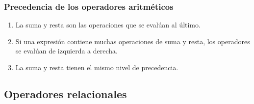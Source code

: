 \documentclass[12pt]{beamer}
\begin{document}
\begin{frame}
\frametitle{Precedencia de los operadores aritméticos}
\begin{enumerate}[<+->]
\conti
\item La suma y resta son las operaciones que se evalúan al último. 
\item Si una expresión contiene muchas operaciones de suma y resta, los operadores se evalúan de izquierda a derecha.
\item La suma y resta tienen el mismo nivel de precedencia.
\end{enumerate}
\end{frame}

\subsection{Operadores relacionales}
\end{document}
